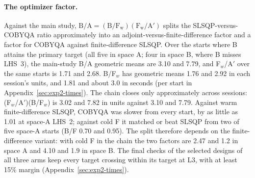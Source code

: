 \paragraph{The optimizer factor.}
Against the main study, $\mathrm{B/A}=(\mathrm{B/F_w})(\mathrm{F_w/A'})$
splits the SLSQP-versus-COBYQA ratio approximately into an
adjoint-versus-finite-difference factor and a factor for COBYQA against
finite-difference SLSQP. Over the starts where B attains the primary target
(all five in space A; four in space B, where B misses LHS~3), the main-study
B/A geometric means are 3.10 and 7.79, and F$_w$/A$'$ over the same starts
is 1.71 and 2.68. B/F$_w$ has geometric means
1.76 and 2.92 in each session's units, and 1.81 and about 3.0 in seconds
(per start in Appendix~\ref{sec:exp2-times}). The chain
closes only approximately across sessions: (F$_w$/A$'$)(B/F$_w$) is 3.02
and 7.82 in units against 3.10 and 7.79. Against warm finite-difference
SLSQP, COBYQA was slower from every start, by as little as 1.01 at
space-A LHS~2; against cold F it matched or beat SLSQP from two of five
space-A starts (B/F 0.70 and 0.95). The split therefore depends on the
finite-difference variant: with cold F in the chain the two factors are
2.47 and 1.2 in space A and 4.10 and 1.9 in space B. The final checks of the selected
designs of all three arms keep every target crossing within its target at
L3, with at least 15\% margin (Appendix~\ref{sec:exp2-times}).
